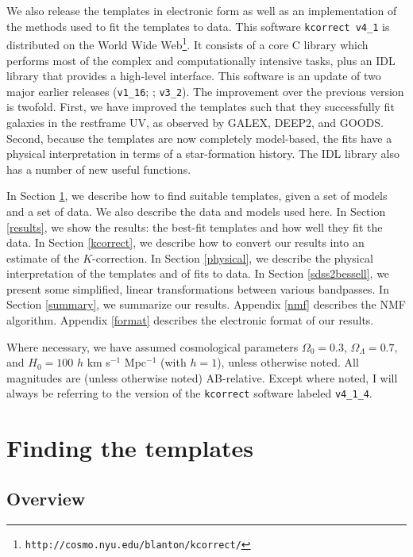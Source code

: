 \documentclass[10pt,preprint]{aastex}
\begin{document}
We also release the templates in electronic form as well as an
implementation of the methods used to fit the templates to data. This
software {\tt kcorrect v4\_1} is distributed on the World Wide
Web{\footnote {\tt http://cosmo.nyu.edu/blanton/kcorrect/}}. It
consists of a core C library which performs most of the complex and
computationally intensive tasks, plus an IDL library that provides a
high-level interface.  This software is an update of two major earlier
releases ({\tt v1\_16}; \citealt{blanton03b}; {\tt v3\_2}). The
improvement over the previous version is twofold. First, we have
improved the templates such that they successfully fit galaxies in the
restframe UV, as observed by GALEX, DEEP2, and GOODS. Second, because
the templates are now completely model-based, the fits have a physical
interpretation in terms of a star-formation history. The IDL library
also has a number of new useful functions.

In Section \ref{algorithm}, we describe how to find suitable
templates, given a set of models and a set of data. We also describe
the data and models used here. In Section \ref{results}, we show the
results: the best-fit templates and how well they fit the data.  In
Section \ref{kcorrect}, we describe how to convert our results into an
estimate of the $K$-correction. In Section \ref{physical}, we describe
the physical interpretation of the templates and of fits to data.  In
Section \ref{sdss2bessell}, we present some simplified, linear
transformations between various bandpasses. In Section \ref{summary},
we summarize our results. Appendix \ref{nmf} describes the NMF
algorithm.  Appendix \ref{format} describes the electronic format of
our results.

Where necessary, we have assumed cosmological parameters $\Omega_0 =
0.3$, $\Omega_\Lambda = 0.7$, and $H_0 = 100$ $h$ km s$^{-1}$
Mpc$^{-1}$ (with $h=1$), unless otherwise noted. All magnitudes are
(unless otherwise noted) AB-relative.  Except where noted, I will
always be referring to the version of the {\tt kcorrect} software
labeled {\tt v4\_1\_4}.

\section{Finding the templates}
\label{algorithm}

\subsection{Overview}
\end{document}
